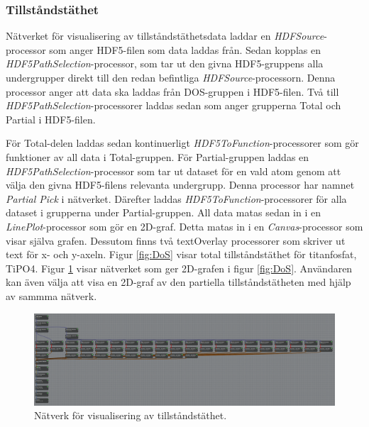 \subsubsection{Tillståndstäthet}
Nätverket för visualisering av tillståndstäthetsdata laddar en \textit{HDFSource}-processor som anger HDF5-filen som data laddas från. Sedan kopplas en \textit{HDF5PathSelection}-processor, som tar ut den givna HDF5-gruppens alla undergrupper direkt till den redan befintliga \textit{HDFSource}-processorn. Denna processor anger att data ska laddas från DOS-gruppen i HDF5-filen. Två till \textit{HDF5PathSelection}-processorer laddas sedan som anger grupperna Total och Partial i HDF5-filen.  

För Total-delen laddas sedan kontinuerligt \textit{HDF5ToFunction}-processorer som gör funktioner av all 
data i Total-gruppen. För Partial-gruppen laddas en \textit{HDF5PathSelection}-processor som tar ut dataset för en vald atom genom att välja den givna HDF5-filens relevanta undergrupp. Denna processor har namnet \textit{Partial Pick} i nätverket. Därefter laddas \textit{HDF5ToFunction}-processorer för alla dataset i grupperna under Partial-gruppen. 
\newpage
All data matas sedan in i en \textit{LinePlot}-processor som gör en 2D-graf. Detta matas in i en \textit{Canvas}-processor som visar själva grafen. Dessutom finns två textOverlay processorer som skriver ut text för x- och y-axeln. Figur \ref{fig:DoS} visar total tillståndstäthet för titanfosfat, TiPO4. Figur \ref{fig:DoSNetwork} visar nätverket som ger 2D-grafen i figur \ref{fig:DoS}. Användaren kan även välja att visa en 2D-graf av den partiella tillståndstätheten med hjälp av sammma nätverk.
\begin{figure}[ht]
    \centering
    \includegraphics[angle=0, width=\linewidth]{images/DoSNetwork.PNG}
    \caption{Nätverk för visualisering av tillståndstäthet.}
    \label{fig:DoSNetwork}
\end{figure}

